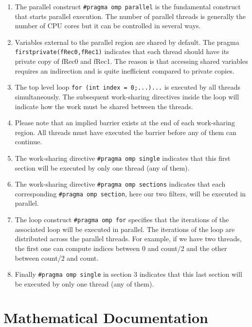 \documentclass[a4paper]{book}
\begin{document}
\begin{enumerate}
\item The parallel construct \lstinline!#pragma omp parallel! is the fundamental construct that starts parallel execution. The number of parallel threads is generally the number of CPU cores but it can be controlled in several ways.

\item Variables external to the parallel region are shared by default. The pragma \lstinline!firstprivate(fRec0,fRec1)! indicates that each thread should have its private copy of fRec0 and fRec1. The reason is that accessing shared variables requires an indirection and is quite inefficient compared to private copies.

\item The top level loop \lstinline!for (int index = 0;...)...! is executed by all threads simultaneously. The subsequent work-sharing directives inside the loop will indicate how the work must be shared between the threads. 

\item Please note that an implied barrier exists at the end of each work-sharing region. All threads must have executed the barrier before any of them can continue.

\item The work-sharing directive \lstinline!#pragma omp single! indicates that this first section will be executed by only one thread (any of them).

\item The work-sharing directive \lstinline!#pragma omp sections! indicates that each corresponding \lstinline!#pragma omp section!, here our two filters, will be executed in parallel.

\item The loop construct \lstinline!#pragma omp for! specifies that the iterations of the associated loop will be executed in parallel. The iterations of the loop are distributed across the parallel threads. For example, if we have two threads, the first one can compute indices between 0 and count/2 and the other between count/2 and count. 

\item Finally \lstinline!#pragma omp single!  in section 3 indicates that this last section will be executed by only one thread (any of them).

\end{enumerate}


\chapter{Mathematical Documentation}
\label{chapter:mdoc}
\end{document}
